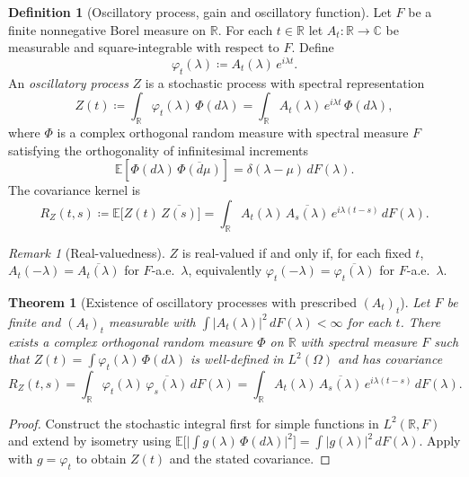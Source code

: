 \documentclass[12pt]{article}
\newtheorem{theorem}{Theorem}
\theoremstyle{definition}
\newtheorem{definition}{Definition}
\theoremstyle{remark}
\newtheorem{remark}{Remark}
\begin{document}
\begin{definition}[Oscillatory process, gain and oscillatory function]
Let $F$ be a finite nonnegative Borel measure on $\mathbb{R}$. For each $t\in\mathbb{R}$ let $A_t:\mathbb{R}\to\mathbb{C}$ be measurable and square-integrable with respect to $F$.
Define
\[
\varphi_t(\lambda)\coloneqq A_t(\lambda)\,e^{i\lambda t}.
\]
An \emph{oscillatory process} $Z$ is a stochastic process with spectral representation
\begin{equation}
  Z(t) \coloneqq \int_{\mathbb{R}} \varphi_t(\lambda)\,\Phi(d\lambda)
  = \int_{\mathbb{R}} A_t(\lambda)\,e^{i\lambda t}\,\Phi(d\lambda),
\end{equation}
where $\Phi$ is a complex orthogonal random measure with spectral measure $F$ satisfying the orthogonality of infinitesimal increments
\begin{equation}
  \mathbb{E}\!\left[\Phi(d\lambda)\,\overline{\Phi(d\mu)}\right] = \delta(\lambda-\mu)\,dF(\lambda).
\end{equation}
The covariance kernel is
\begin{equation}
  R_Z(t,s)\coloneqq \mathbb{E}\big[Z(t)\,\overline{Z(s)}\big]
  = \int_{\mathbb{R}} A_t(\lambda)\,\overline{A_s(\lambda)}\,e^{i\lambda(t-s)}\,dF(\lambda).
\end{equation}
\end{definition}

\begin{remark}[Real-valuedness]
$Z$ is real-valued if and only if, for each fixed $t$, $A_t(-\lambda)=\overline{A_t(\lambda)}$ for $F$-a.e.\ $\lambda$, equivalently $\varphi_t(-\lambda)=\overline{\varphi_t(\lambda)}$ for $F$-a.e.\ $\lambda$.
\end{remark}

\begin{theorem}[Existence of oscillatory processes with prescribed $(A_t)_t$]
Let $F$ be finite and $(A_t)_t$ measurable with $\int |A_t(\lambda)|^2\,dF(\lambda)<\infty$ for each $t$. There exists a complex orthogonal random measure $\Phi$ on $\mathbb{R}$ with spectral measure $F$ such that $Z(t)=\int \varphi_t(\lambda)\,\Phi(d\lambda)$ is well-defined in $L^2(\Omega)$ and has covariance
\[
R_Z(t,s)=\int_{\mathbb{R}} \varphi_t(\lambda)\,\overline{\varphi_s(\lambda)}\,dF(\lambda)
=\int_{\mathbb{R}} A_t(\lambda)\,\overline{A_s(\lambda)}\,e^{i\lambda(t-s)}\,dF(\lambda).
\]
\end{theorem}

\begin{proof}
Construct the stochastic integral first for simple functions in $L^2(\mathbb{R},F)$ and extend by isometry using $\mathbb{E}\big[\big|\int g(\lambda)\,\Phi(d\lambda)\big|^2\big]=\int |g(\lambda)|^2\,dF(\lambda)$. Apply with $g=\varphi_t$ to obtain $Z(t)$ and the stated covariance.
\end{proof}
\end{document}
